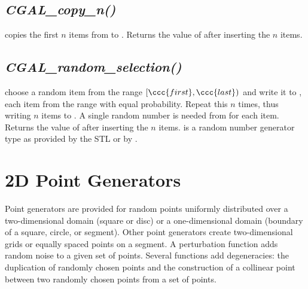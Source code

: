 \subsection{{\it CGAL\_copy\_n()}}
\label{sectionCopyN}


{copies the first $n$ items from  to .
    Returns the value of  after inserting the $n$ items.}

\subsection{{\it CGAL\_random\_selection()}}
\label{sectionRandomSelection}


{ choose a random item from the range $[\ccc{first},\ccc{last})$ and
    write it to , each item from the range with equal
    probability. Repeat this $n$ times, thus writing $n$ items to
    .
    A single random number is needed from  for each item.
    Returns the value of  after inserting the $n$ items.
    \ccPrecond {} is a random number generator type as provided 
    by the STL or by .
}



\newpage
\section{2D Point Generators}

\ccDefinition

Point generators are provided for random points uniformly distributed
over a two-dimensional domain (square or disc) or a one-dimensional
domain (boundary of a square, circle, or segment). Other point
generators create two-dimensional grids or equally spaced points on a
segment. A perturbation function adds random noise to a given set of
points. Several functions add degeneracies: the duplication of randomly
chosen points and the construction of a collinear point between two randomly
chosen points from a set of points.


